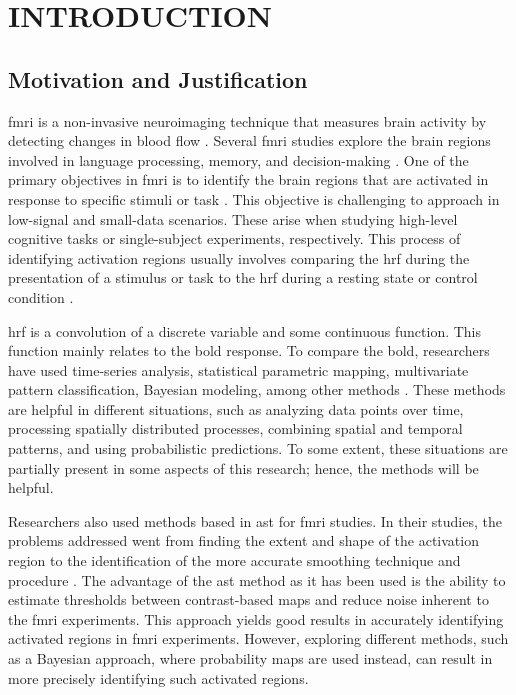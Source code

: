 \chapter{INTRODUCTION}

\section{Motivation and Justification}

\gls{fmri} is a non-invasive neuroimaging technique that measures brain 
activity by detecting changes in blood flow \cite{buchbinder2016functional, 
logothetis2008we, christopher2008applications}. Several \gls{fmri} studies 
explore the brain regions involved in language processing, memory, and 
decision-making \cite{gaillard2003developmental,golby2005memory,heekeren2003fmri}. 
One of the primary objectives in \gls{fmri} is to identify the brain regions 
that are activated in response to specific stimuli or 
task \cite{orchard2003simultaneous, deneux2006using, ardekani1999activation}. 
This objective is challenging to approach in low-signal and small-data scenarios. 
These arise when studying high-level cognitive tasks or single-subject 
experiments, respectively. This process of identifying activation regions 
usually involves comparing the \gls{hrf} during the presentation of a 
stimulus or task to the \gls{hrf} during a resting state or control 
condition \cite{arthurs2002well, logothetis2004nature, lee2013resting}.

\gls{hrf} is a convolution of a discrete variable and some continuous 
function. This function mainly relates to the \gls{bold} response. 
To compare the \gls{bold}, researchers have used time-series analysis, 
statistical parametric mapping, multivariate pattern classification, 
Bayesian modeling, among other methods 
\cite{adrian2018complex, marchini2004comparing, mumford2012deconvolving, makni2008fully}. 
These methods are helpful in different situations, such as analyzing data 
points over time, processing spatially distributed processes, combining 
spatial and temporal patterns, and using probabilistic predictions. 
To some extent, these situations are partially present in some aspects 
of this research; hence, the methods will be helpful.

Researchers also used methods based in \gls{ast} for \gls{fmri} studies. 
In their studies, the problems addressed went from finding the extent and 
shape of the activation region to the identification of the more accurate 
smoothing technique and procedure 
\cite{tabelow2006analyzing, lindquist2010adaptive, strappini2017adaptive,almodovar2019fast}. 
The advantage of the \gls{ast} method as it has been used is the ability to 
estimate thresholds between contrast-based maps and reduce noise inherent to 
the \gls{fmri} experiments. This approach yields good results in accurately 
identifying activated regions in \gls{fmri} experiments. However, exploring 
different methods, such as a Bayesian approach, where probability maps are 
used instead, can result in more precisely identifying such activated regions.

